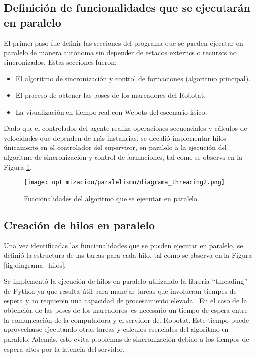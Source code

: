 \subsection{Definición de funcionalidades que se ejecutarán en paralelo}
El primer paso fue definir las secciones del programa que se pueden ejecutar en paralelo de manera autónoma sin depender de estados externos o recursos no sincronizados. Estas secciones fueron:
\begin{itemize}
	\item El algoritmo de sincronización y control de formaciones (algoritmo principal).
	\item El proceso de obtener las poses de los marcadores del Robotat.
	\item La visualización en tiempo real con Webots del escenario físico.
\end{itemize}

Dado que el controlador del agente realiza operaciones secuenciales y cálculos de velocidades que dependen de más instancias, se decidió implementar hilos únicamente en el controlador del supervisor, en paralelo a la ejecución del algoritmo de sincronización y control de formaciones, tal como se observa en la Figura \ref{fig:hilos}.

\begin{figure}[H]
	\centering
	\texttt{[image: optimizacion/paralelismo/diagrama\_threading2.png]}
	\caption{Funcionalidades del algoritmo que se ejecutan en paralelo.}
	\label{fig:hilos}
\end{figure}

\subsection{Creación de hilos en paralelo}

Una vez identificadas las funcionalidades que se pueden ejecutar en paralelo, se definió la estructura de las tareas para cada hilo, tal como se observa en la Figura \ref{fig:diagrama_hilos}. 

Se implementó la ejecución de hilos en paralelo utilizando la librería ``threading'' de Python ya que resulta útil para manejar tareas que involucran tiempos de espera y no requieren una capacidad de procesamiento elevada \cite{PythonThreading}. En el caso de la obtención de las poses de los marcadores, es necesario un tiempo de espera entre la comunicación de la computadora y el servidor del Robotat. Este tiempo puede aprovecharse ejecutando otras tareas y cálculos esenciales del algoritmo en paralelo. Además, esto evita problemas de sincronización debido a los tiempos de espera altos por la latencia del servidor.

